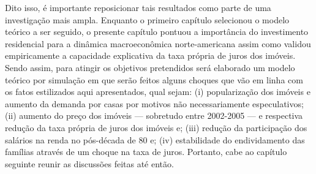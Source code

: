 Dito isso, é importante reposicionar tais resultados como parte de uma investigação mais ampla.
Enquanto o primeiro capítulo selecionou o modelo teórico a ser seguido, o presente capítulo pontuou a importância do investimento residencial para a dinâmica macroeconômica norte-americana assim como validou empiricamente a capacidade explicativa da taxa própria de juros dos imóveis.
Sendo assim, para atingir os objetivos pretendidos será elaborado um modelo teórico por simulação em que serão feitos alguns choques que vão em linha com os fatos estilizados aqui apresentados, qual sejam:
(i) popularização dos imóveis e aumento da demanda por casas por motivos não necessariamente especulativos;
(ii) aumento do preço dos imóveis --- sobretudo entre 2002-2005 --- e respectiva redução da taxa própria de juros dos imóveis e;
(iii) redução da participação dos salários na renda no pós-década de 80 e;
(iv) estabilidade do endividamento das famílias através de um choque na taxa de juros.
Portanto, cabe ao capítulo seguinte reunir as discussões feitas até então.



